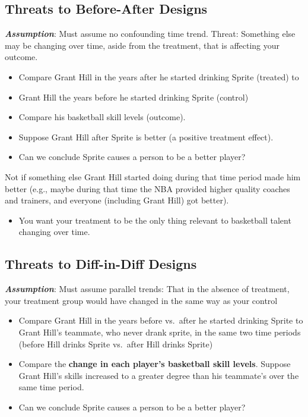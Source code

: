 \documentclass[
  letterpaper,
  DIV=11,
  numbers=noendperiod]{scrreprt}
\providecommand{\tightlist}{%
  \setlength{\itemsep}{0pt}\setlength{\parskip}{0pt}}\usepackage{longtable,booktabs,array}
\begin{document}
\hypertarget{threats-to-before-after-designs}{%
\subsection{Threats to Before-After
Designs}\label{threats-to-before-after-designs}}

\textbf{\emph{Assumption}}: Must assume no confounding time trend.
Threat: Something else may be changing over time, aside from the
treatment, that is affecting your outcome.

\begin{itemize}
\tightlist
\item
  Compare Grant Hill in the years after he started drinking Sprite
  (treated) to
\item
  Grant Hill the years before he started drinking Sprite (control)
\item
  Compare his basketball skill levels (outcome).
\item
  Suppose Grant Hill after Sprite is better (a positive treatment
  effect).
\item
  Can we conclude Sprite causes a person to be a better player?
\end{itemize}

Not if something else Grant Hill started doing during that time period
made him better (e.g., maybe during that time the NBA provided higher
quality coaches and trainers, and everyone (including Grant Hill) got
better).

\begin{itemize}
\tightlist
\item
  You want your treatment to be the only thing relevant to basketball
  talent changing over time.
\end{itemize}

\hypertarget{threats-to-diff-in-diff-designs}{%
\subsection{Threats to Diff-in-Diff
Designs}\label{threats-to-diff-in-diff-designs}}

\textbf{\emph{Assumption}}: Must assume parallel trends: That in the
absence of treatment, your treatment group would have changed in the
same way as your control

\begin{itemize}
\tightlist
\item
  Compare Grant Hill in the years before vs.~after he started drinking
  Sprite to Grant Hill's teammate, who never drank sprite, in the same
  two time periods (before Hill drinks Sprite vs.~after Hill drinks
  Sprite)
\item
  Compare the \textbf{change in each player's basketball skill levels}.
  Suppose Grant Hill's skills increased to a greater degree than his
  teammate's over the same time period.
\item
  Can we conclude Sprite causes a person to be a better player?
\end{itemize}
\end{document}
